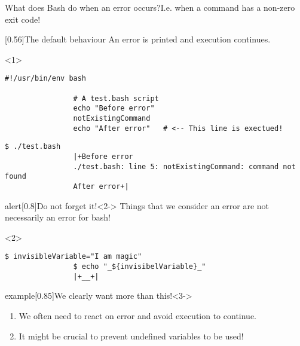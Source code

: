 \begin{frame}[fragile]{What does Bash do when an error occurs?}{I.e. when a command has a non-zero exit code!}
    \vspace{-3mm}
    \begin{overlayarea}{\textwidth}{0.7\textheight}
        \begin{varblock}{}[0.56\textwidth]{The default behaviour}
            An error is printed and \alert{execution continues}.
        \end{varblock}
        \begin{onlyenv}<1>
            \begin{lstlisting}[style=myBash, numbers=none, aboveskip=5mm]
                #!/usr/bin/env bash

                # A test.bash script
                echo "Before error"
                notExistingCommand
                echo "After error"   # <-- This line is exectued!
            \end{lstlisting}
            \begin{lstlisting}[style=myBash, numbers=none, aboveskip=2mm]
                $ ./test.bash
                |+Before error
                ./test.bash: line 5: notExistingCommand: command not found
                After error+|
            \end{lstlisting}
        \end{onlyenv}
        \begin{varblock}{alert}[0.8\textwidth]{Do not forget it!}<2->
            Things that we consider an error are not necessarily an error for bash!
        \end{varblock}
        \begin{onlyenv}<2>
            \begin{lstlisting}[style=myBash, numbers=none, aboveskip=5mm]
                $ invisibleVariable="I am magic"
                $ echo "_${invisibelVariable}_"
                |+__+|
            \end{lstlisting}
        \end{onlyenv}
        \begin{varblock}{example}[0.85\textwidth]{We clearly want more than this!}<3->
            \begin{enumerate}
                \item We often need to react on error and avoid execution to continue.
                \item It might be crucial to prevent undefined variables to be used!
            \end{enumerate}

\end{varblock}
\end{overlayarea}
\end{frame}
